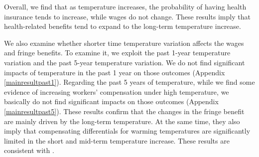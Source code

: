 \documentclass[12pt]{article}
\begin{document}
Overall, we find that as temperature increases, the probability of having health insurance tends to increase, while wages do not change. These results imply that health-related benefits tend to expand to the long-term temperature increase. 

We also examine whether shorter time temperature variation affects the wages and fringe benefits. To examine it, we exploit the past 1-year temperature variation and the past 5-year temperature variation. We do not find significant impacts of temperature in the past 1 year on those outcomes (Appendix \ref{mainresultpast1}). Regarding the past 5 years of temperature, while we find some evidence of increasing workers' compensation under high temperature, we basically do not find significant impacts on those outcomes (Appendix \ref{mainresultpast5}). These results confirm that the changes in the fringe benefit are mainly driven by the long-term temperature. At the same time, they also imply that compensating differentials for warming temperatures are significantly limited in the short and mid-term temperature increase. These results are consistent with \citep{park_temperature_2021}. 
\end{document}
